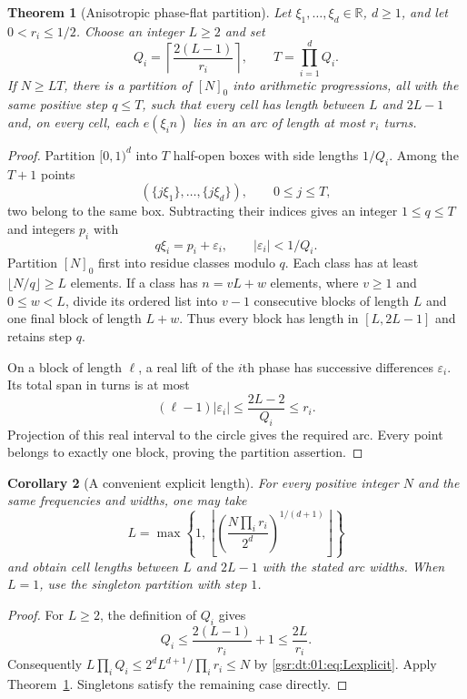 \documentclass[11pt,letterpaper]{article}
\numberwithin{equation}{section}
\newtheorem{theorem}{Theorem}[section]
\newtheorem{corollary}[theorem]{Corollary}
\theoremstyle{definition}
\theoremstyle{remark}
\newcommand{\R}{\mathbb R}
\newcommand{\1}{\mathbf 1}
\newcommand{\floor}[1]{\left\lfloor#1\right\rfloor}
\newcommand{\ceil}[1]{\left\lceil#1\right\rceil}
\begin{document}
\begin{theorem}[Anisotropic phase-flat partition]\label{gsr:dt:01:thm:partition}
Let $\xi_1,\ldots,\xi_d\in\R$, $d\ge1$, and let
$0<r_i\le1/2$. Choose an integer $L\ge2$ and set
\begin{equation}\label{gsr:dt:01:eq:Q}
 Q_i=\ceil{\frac{2(L-1)}{r_i}},\qquad T=\prod_{i=1}^dQ_i.
\end{equation}
If $N\ge LT$, there is a partition of $[N]_0$ into arithmetic
progressions, all with the same positive step $q\le T$, such that every
cell has length between $L$ and $2L-1$ and, on every cell, each
$e(\xi_i n)$ lies in an arc of length at most $r_i$ turns.
\end{theorem}
\begin{proof}
Partition $[0,1)^d$ into $T$ half-open boxes with side lengths $1/Q_i$.
Among the $T+1$ points
\[
 (\{j\xi_1\},\ldots,\{j\xi_d\}),\qquad 0\le j\le T,
\]
two belong to the same box. Subtracting their indices gives an integer
$1\le q\le T$ and integers $p_i$ with
\begin{equation}\label{gsr:dt:01:eq:Dirichlet}
 q\xi_i=p_i+\varepsilon_i,\qquad |\varepsilon_i|<1/Q_i.
\end{equation}
Partition $[N]_0$ first into residue classes modulo $q$. Each class has
at least $\lfloor N/q\rfloor\ge L$ elements. If a class has $n=vL+w$
elements, where $v\ge1$ and $0\le w<L$, divide its ordered list into
$v-1$ consecutive blocks of length $L$ and one final block of length
$L+w$. Thus every block has length in $[L,2L-1]$ and retains step $q$.

On a block of length $\ell$, a real lift of the $i$th phase has successive
differences $\varepsilon_i$. Its total span in turns is at most
\[
 (\ell-1)|\varepsilon_i|
 \le\frac{2L-2}{Q_i}\le r_i.
\]
Projection of this real interval to the circle gives the required arc.
Every point belongs to exactly one block, proving the partition assertion.
\end{proof}

\begin{corollary}[A convenient explicit length]\label{gsr:dt:01:cor:partitionlength}
For every positive integer $N$ and the same frequencies and widths, one
may take
\begin{equation}\label{gsr:dt:01:eq:Lexplicit}
 L=\max\left\{1,
 \floor{\left(\frac{N\prod_i r_i}{2^d}\right)^{1/(d+1)}}\right\}
\end{equation}
and obtain cell lengths between $L$ and $2L-1$ with the stated arc widths.
When $L=1$, use the singleton partition with step $1$.
\end{corollary}
\begin{proof}
For $L\ge2$, the definition of $Q_i$ gives
\[
 Q_i\le\frac{2(L-1)}{r_i}+1\le\frac{2L}{r_i}.
\]
Consequently $L\prod_iQ_i\le2^dL^{d+1}/\prod_i r_i\le N$ by
\eqref{gsr:dt:01:eq:Lexplicit}. Apply Theorem~\ref{gsr:dt:01:thm:partition}. Singletons
satisfy the remaining case directly.
\end{proof}
\end{document}
